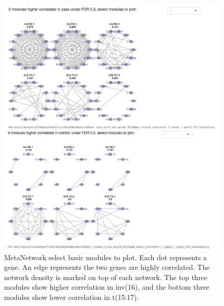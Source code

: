 \begin{figure}[H]
\begin{center}
\includegraphics[scale=0.7]{./figure/MetaNetwork/MetaNetworkBMplot.pdf}
\caption{MetaNetwork select basic modules to plot.
Each dot represents a gene.
An edge represents the two genes are highly correlated.
The network density is marked on top of each network.
The top three modules show higher correlation in inv(16), 
and the bottom three modules show lower correlation in t(15:17).
}
\label{fig:MetaNetworkBMplot}
\end{center}
\end{figure}
